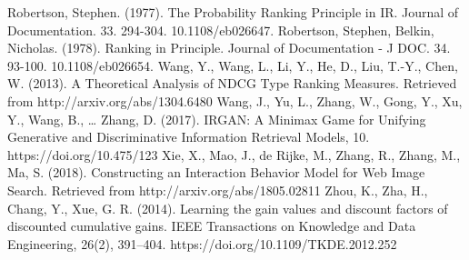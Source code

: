 \documentclass[a4paper, 10pt, conference]{ieeeconf}
\begin{document}
\begin{thebibliography}{99}
Robertson, Stephen. (1977). The Probability Ranking Principle in IR. Journal of Documentation. 33. 294-304. 10.1108/eb026647.
Robertson, Stephen, Belkin, Nicholas. (1978). Ranking in Principle. Journal of Documentation - J DOC. 34. 93-100. 10.1108/eb026654.
Wang, Y., Wang, L., Li, Y., He, D., Liu, T.-Y., Chen, W. (2013). A Theoretical Analysis of NDCG Type Ranking Measures. Retrieved from http://arxiv.org/abs/1304.6480
Wang, J., Yu, L., Zhang, W., Gong, Y., Xu, Y., Wang, B., … Zhang, D. (2017). IRGAN: A Minimax Game for Unifying Generative and Discriminative Information Retrieval Models, 10. https://doi.org/10.475/123
Xie, X., Mao, J., de Rijke, M., Zhang, R., Zhang, M., Ma, S. (2018). Constructing an Interaction Behavior Model for Web Image Search. Retrieved from http://arxiv.org/abs/1805.02811
Zhou, K., Zha, H., Chang, Y., Xue, G. R. (2014). Learning the gain values and discount factors of discounted cumulative gains. IEEE Transactions on Knowledge and Data Engineering, 26(2), 391–404. https://doi.org/10.1109/TKDE.2012.252
\end{thebibliography}
\end{document}
